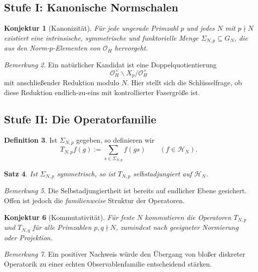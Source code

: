\documentclass[12pt,a4paper]{article}
\theoremstyle{plain}
\newtheorem{satz}{Satz}[section]
\newtheorem{konjektur}[satz]{Konjektur}
\theoremstyle{definition}
\newtheorem{definition}[satz]{Definition}
\theoremstyle{remark}
\newtheorem{bemerkung}[satz]{Bemerkung}
\newcommand{\OH}{\mathcal O_H}
\newcommand{\HN}{\mathcal H_N}
\begin{document}
	\subsection{Stufe I: Kanonische Normschalen}
	
	\begin{konjektur}[Kanonizität]
		Für jede ungerade Primzahl \(p\) und jedes \(N\) mit \(p\nmid N\) existiert eine intrinsische,
		symmetrische und funktorielle Menge \(\Sigma_{N,p}\subseteq G_N\), die aus den Norm-\(p\)-Elementen
		von \(\OH\) hervorgeht.
	\end{konjektur}
	
	\begin{bemerkung}
		Ein natürlicher Kandidat ist eine Doppelquotientierung
		\[
		\OH^\times \backslash X_p / \OH^\times
		\]
		mit anschließender Reduktion modulo \(N\). Hier stellt sich die Schlüsselfrage, ob diese
		Reduktion endlich-zu-eins mit kontrollierter Fasergröße ist.
	\end{bemerkung}
	
	\subsection{Stufe II: Die Operatorfamilie}
	
	\begin{definition}
		Ist \(\Sigma_{N,p}\) gegeben, so definieren wir
		\[
		T_{N,p}f(g):=\sum_{s\in \Sigma_{N,p}} f(gs)
		\qquad (f\in\HN).
		\]
	\end{definition}
	
	\begin{satz}
		Ist \(\Sigma_{N,p}\) symmetrisch, so ist \(T_{N,p}\) selbstadjungiert auf \(\HN\).
	\end{satz}
	
	\begin{bemerkung}
		Die Selbstadjungiertheit ist bereits auf endlicher Ebene gesichert. Offen ist jedoch die
		\emph{familienweise} Struktur der Operatoren.
	\end{bemerkung}
	
	\begin{konjektur}[Kommutativität]
		Für feste \(N\) kommutieren die Operatoren \(T_{N,p}\) und \(T_{N,q}\) für alle Primzahlen
		\(p,q\nmid N\), zumindest nach geeigneter Normierung oder Projektion.
	\end{konjektur}
	
	\begin{bemerkung}
		Ein positiver Nachweis würde den Übergang von bloßer diskreter Operatorik zu einer echten
		Observablenfamilie entscheidend stärken.
	\end{bemerkung}
	
\end{document}

